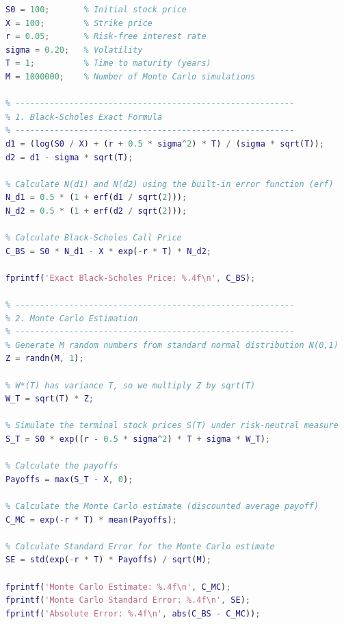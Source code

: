 \documentclass{article}
\begin{document}
\begin{lstlisting}[language=Matlab]
% Parameters Selection
S0 = 100;       % Initial stock price
X = 100;        % Strike price
r = 0.05;       % Risk-free interest rate
sigma = 0.20;   % Volatility
T = 1;          % Time to maturity (years)
M = 1000000;    % Number of Monte Carlo simulations

% ---------------------------------------------------------
% 1. Black-Scholes Exact Formula
% ---------------------------------------------------------
d1 = (log(S0 / X) + (r + 0.5 * sigma^2) * T) / (sigma * sqrt(T));
d2 = d1 - sigma * sqrt(T);

% Calculate N(d1) and N(d2) using the built-in error function (erf)
N_d1 = 0.5 * (1 + erf(d1 / sqrt(2)));
N_d2 = 0.5 * (1 + erf(d2 / sqrt(2)));

% Calculate Black-Scholes Call Price
C_BS = S0 * N_d1 - X * exp(-r * T) * N_d2;

fprintf('Exact Black-Scholes Price: %.4f\n', C_BS);

% ---------------------------------------------------------
% 2. Monte Carlo Estimation
% ---------------------------------------------------------
% Generate M random numbers from standard normal distribution N(0,1)
Z = randn(M, 1);

% W*(T) has variance T, so we multiply Z by sqrt(T)
W_T = sqrt(T) * Z;

% Simulate the terminal stock prices S(T) under risk-neutral measure
S_T = S0 * exp((r - 0.5 * sigma^2) * T + sigma * W_T);

% Calculate the payoffs
Payoffs = max(S_T - X, 0);

% Calculate the Monte Carlo estimate (discounted average payoff)
C_MC = exp(-r * T) * mean(Payoffs);

% Calculate Standard Error for the Monte Carlo estimate
SE = std(exp(-r * T) * Payoffs) / sqrt(M);

fprintf('Monte Carlo Estimate: %.4f\n', C_MC);
fprintf('Monte Carlo Standard Error: %.4f\n', SE);
fprintf('Absolute Error: %.4f\n', abs(C_BS - C_MC));
\end{lstlisting}
\end{document}
